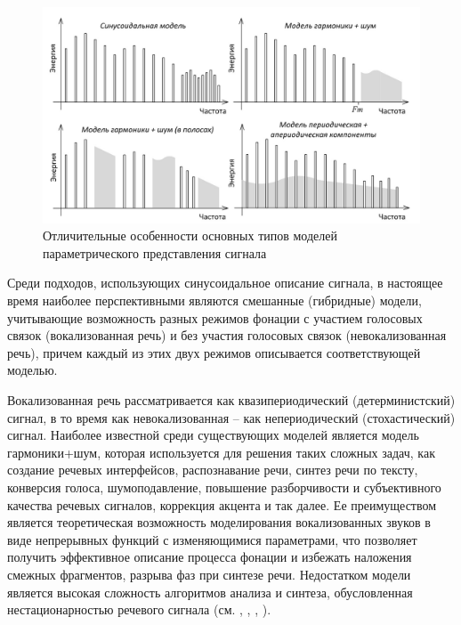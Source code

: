 \begin{figure}[H]
    \centerline{
        \includegraphics[scale=1.0, width=1.0\textwidth]{author/part4/figures/ch43_fig05_signal-model-types-ru.png}
    }
    \caption{Отличительные особенности  основных типов моделей параметрического представления сигнала}
    \label{fig:signal-model-types-ru}
\end{figure}

Среди подходов, использующих синусоидальное описание сигнала, в настоящее время наиболее перспективными являются смешанные (гибридные) модели, учитывающие возможность разных режимов фонации с участием голосовых связок (вокализованная речь) и без участия голосовых связок (невокализованная речь), причем каждый из этих двух режимов описывается соответствующей моделью. 

Вокализованная речь рассматривается как квазипериодический (детерминистский) сигнал, в то время как невокализованная – как непериодический (стохастический) сигнал. Наиболее известной среди существующих моделей является модель гармоники+шум, которая используется для решения таких сложных задач, как создание речевых интерфейсов, распознавание речи, синтез речи по тексту, конверсия голоса, шумоподавление, повышение разборчивости и субъективного качества речевых сигналов, коррекция акцента и так далее. Ее преимуществом является теоретическая возможность моделирования вокализованных звуков в виде непрерывных функций с изменяющимися параметрами, что позволяет получить эффективное описание процесса фонации и избежать наложения смежных фрагментов, разрыва фаз при синтезе речи. Недостатком модели является высокая сложность алгоритмов анализа и синтеза, обусловленная нестационарностью речевого сигнала (см. , , , ). 


